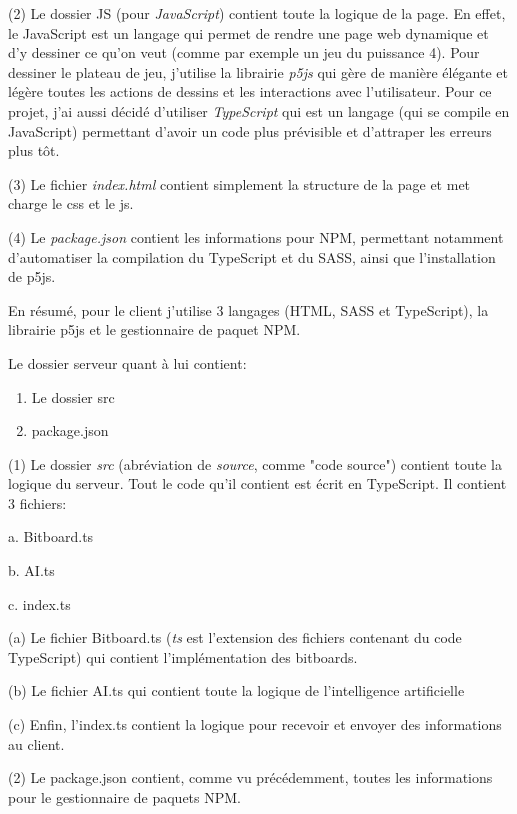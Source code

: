 \documentclass[a4paper]{article}
\begin{document}
	(2) Le dossier JS (pour \textit{JavaScript}) contient toute la logique de la page. En effet, le JavaScript est un langage qui permet de rendre une page web dynamique et d'y dessiner ce qu'on veut (comme par exemple un jeu du puissance 4). Pour dessiner le plateau de jeu, j'utilise la librairie \textit{p5js} qui gère de manière élégante et légère toutes les actions de dessins et les interactions avec l'utilisateur. Pour ce projet, j'ai aussi décidé d'utiliser \textit{TypeScript} qui est un langage (qui se compile en JavaScript) permettant d'avoir un code plus prévisible et d'attraper les erreurs plus tôt.

	(3) Le fichier \textit{index.html} contient simplement la structure de la page et met charge le css et le js.

	(4) Le \textit{package.json} contient les informations pour NPM, permettant notamment d'automatiser la compilation du TypeScript et du SASS, ainsi que l'installation de p5js.

	En résumé, pour le client j'utilise 3 langages (HTML, SASS et TypeScript), la librairie p5js et le gestionnaire de paquet NPM.

	Le dossier serveur quant à lui contient:
	\begin{enumerate}
		\item Le dossier src
		\item package.json
	\end{enumerate}

	(1) Le dossier \textit{src} (abréviation de \textit{source}, comme "code source") contient toute la logique du serveur. Tout le code qu'il contient est écrit en TypeScript. Il contient 3 fichiers:
	\quad\begin{description}
		\item{a.} Bitboard.ts
		\item{b.} AI.ts
		\item{c.} index.ts
	\end{description}
    
	(a) Le fichier Bitboard.ts (\textit{ts} est l'extension des fichiers contenant du code TypeScript) qui contient l'implémentation des bitboards.

	(b) Le fichier AI.ts qui contient toute la logique de l'intelligence artificielle

	(c) Enfin, l'index.ts contient la logique pour recevoir et envoyer des informations au client.

	(2) Le package.json contient, comme vu précédemment, toutes les informations pour le gestionnaire de paquets NPM.
\end{document}
